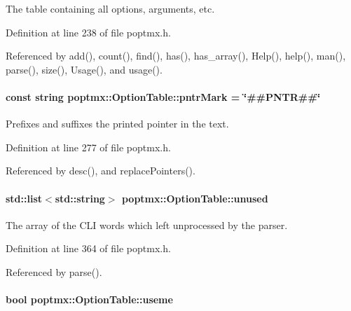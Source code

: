 The table containing all options, arguments, etc. 



Definition at line 238 of file poptmx.h.



Referenced by add(), count(), find(), has(), has\_\-array(), Help(), help(), man(), parse(), size(), Usage(), and usage().

\hypertarget{classpoptmx_1_1OptionTable_aa7bc68b6c6c485432febb607beb85ec1}{
\paragraph[{pntrMark}]{\setlength{\rightskip}{0pt plus 5cm}const string {\bf poptmx::OptionTable::pntrMark} = \char`\"{}\#\#PNTR\#\#\char`\"{}}\hfill}
\label{classpoptmx_1_1OptionTable_aa7bc68b6c6c485432febb607beb85ec1}


Prefixes and suffixes the printed pointer in the text. 



Definition at line 277 of file poptmx.h.



Referenced by desc(), and replacePointers().

\hypertarget{classpoptmx_1_1OptionTable_a07cd1458c18f70d0cb5c7e9a3489c04f}{
\paragraph[{unused}]{\setlength{\rightskip}{0pt plus 5cm}std::list$<$std::string$>$ {\bf poptmx::OptionTable::unused}}\hfill}
\label{classpoptmx_1_1OptionTable_a07cd1458c18f70d0cb5c7e9a3489c04f}


The array of the CLI words which left unprocessed by the parser. 



Definition at line 364 of file poptmx.h.



Referenced by parse().

\hypertarget{classpoptmx_1_1OptionTable_aa3aab8995cf0a39e49946c7993d11d76}{
\paragraph[{useme}]{\setlength{\rightskip}{0pt plus 5cm}bool {\bf poptmx::OptionTable::useme}}\hfill}
\label{classpoptmx_1_1OptionTable_aa3aab8995cf0a39e49946c7993d11d76}


